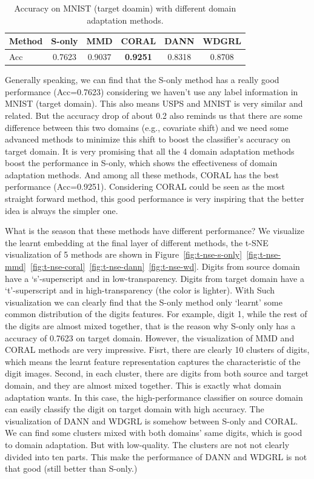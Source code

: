 \documentclass{article} %
\begin{document}
	\begin{table}[h]
		\centering
		\begin{tabular}{l|ccccc}
			\toprule
			Method &S-only&MMD&CORAL&DANN&WDGRL\\
			\midrule
			Acc&0.7623&0.9037&\textbf{0.9251}&0.8318&0.8708\\
			
\bottomrule	
		\end{tabular}
		\caption{Accuracy on MNIST (target doamin) with different domain adaptation methods. }
		\label{tab:domain-adaptation}
	\end{table}
Generally speaking, we can find that the S-only method has a really good performance (Acc=0.7623) considering we haven't use any label information in MNIST (target domain). This also means USPS and MNIST is very similar and related. But the accuracy drop of about 0.2 also reminds us that there are some difference between this two domains (e.g., covariate shift) and we need some advanced methods to minimize this shift to boost the classifier's accuracy on target domain. It is very promising that all the 4 domain adaptation methods boost the performance in S-only, which shows the effectiveness of domain adaptation methods. And among all these methods, CORAL has the best performance (Acc=0.9251). Considering CORAL could be seen as the most straight forward method, this good performance is very inspiring that the better idea is always the simpler one.

What is the season that these methods have different performance? We visualize the learnt embedding at the final layer of different methods, the t-SNE visualization of 5 methods are shown in Figure~\ref{fig:t-nse-s-only}~\ref{fig:t-nse-mmd}~\ref{fig:t-nse-coral}~\ref{fig:t-nse-dann}~\ref{fig:t-nse-wd}. Digits from source domain have a `s'-superscript and in low-transparency. Digits from target domain have a `t'-superscript and in high-transparency (the color is lighter).  With Such visualization we can clearly find that the S-only method only `learnt' some common distribution of the digits features. For example, digit 1, while the rest of the digits are almost mixed together, that is the reason why S-only only has a accuracy of 0.7623 on target domain. However, the visualization of MMD and CORAL methods are very impressive. Fisrt, there are clearly 10 clusters of digits, which means the learnt feature representation captures the characteristic of the digit images. Second, in each cluster, there are digits from both source and target domain, and they are almost mixed together. This is exactly what domain adaptation wants. In this case, the high-performance classifier on source domain can easily classify the digit on target domain with high accuracy. The visualization of DANN and WDGRL is somehow between S-only and CORAL. We can find some clusters mixed with both domains' same digits, which is good to domain adaptation. But with low-quality. The clusters are not not clearly divided into ten parts. This make the performance of DANN and WDGRL is not that good (still better than S-only.)
\end{document}
